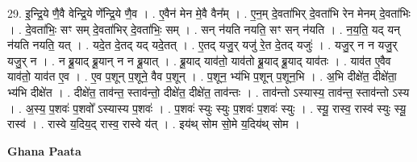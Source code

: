 \documentclass[17pt]{extarticle}
\begin{document}
29. इ॒न्द्रि॒ये णै॒वै वेन्द्रि॒ये णे᳚न्द्रि॒ये णै॒व । . ए॒वैन॑ मेन मे॒वै वैन᳚म् । . ए॒न॒म् दे॒वता॑भिर् दे॒वता॑भि रेन मेनम् दे॒वता॑भिः । . दे॒वता॑भिः॒ सꣳ सम् दे॒वता॑भिर् दे॒वता॑भिः॒ सम् । . सन् न॑यति नयति॒ सꣳ सन् न॑यति । . न॒य॒ति॒ यद् यन् न॑यति नयति॒ यत् । . यदे॒त दे॒तद् यद् यदे॒तत् । . ए॒तद् यजु॒र् यजु॑ रे॒त दे॒तद् यजुः॑ । . यजु॒र् न न यजु॒र् यजु॒र् न । . न ब्रू॒याद् ब्रू॒यान् न न ब्रू॒यात् । . ब्रू॒याद् याव॑तो॒ याव॑तो ब्रू॒याद् ब्रू॒याद् याव॑तः । . याव॑त ए॒वैव याव॑तो॒ याव॑त ए॒व । . ए॒व प॒शून् प॒शूने॒ वैव प॒शून् । . प॒शून॒ भ्य॑भि प॒शून् प॒शून॒भि । . अ॒भि दीक्षे॑त॒ दीक्षे॑ता॒ भ्य॑भि दीक्षे॑त । . दीक्षे॑त॒ ताव॑न्त॒ स्ताव॑न्तो॒ दीक्षे॑त॒ दीक्षे॑त॒ ताव॑न्तः । . ताव॑न्तो ऽस्यास्य॒ ताव॑न्त॒ स्ताव॑न्तो ऽस्य । . अ॒स्य॒ प॒शवः॑ प॒शवो᳚ ऽस्यास्य प॒शवः॑ । . प॒शवः॑ स्युः स्युः प॒शवः॑ प॒शवः॑ स्युः । . स्यू॒ रास्व॒ रास्व॑ स्युः स्यू॒ रास्व॑ । . रास्वे य॒दिय॒द् रास्व॒ रास्वे य॑त् । . इय॑थ् सोम सो॒मे य॒दिय॑थ् सोम । \newline

\textbf{Ghana Paata } \newline
\end{document}
